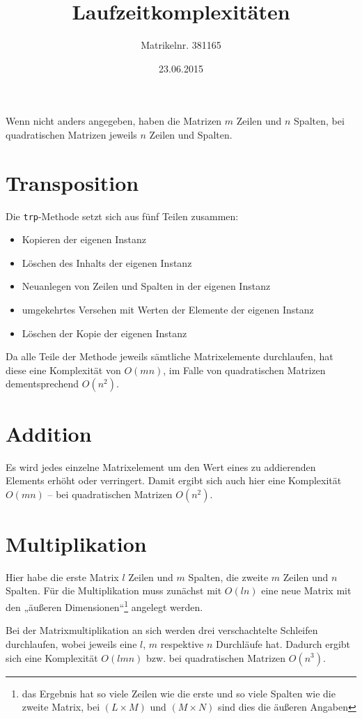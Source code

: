 \documentclass[a4paper,11pt]{scrartcl}
\title{Laufzeitkomplexitäten}
\author{Matrikelnr. 381165}
\date{23.06.2015}
\begin{document}
\maketitle

Wenn nicht anders angegeben, haben die Matrizen $m$ Zeilen und $n$ Spalten, 
bei quadratischen Matrizen jeweils $n$ Zeilen und Spalten.

\section{Transposition}
Die \texttt{trp}-Methode setzt sich aus fünf Teilen zusammen:

\begin{itemize}
    \item Kopieren der eigenen Instanz
    \item Löschen des Inhalts der eigenen Instanz
    \item Neuanlegen von Zeilen und Spalten in der eigenen Instanz
    \item umgekehrtes Versehen mit Werten der Elemente der eigenen Instanz
    \item Löschen der Kopie der eigenen Instanz
\end{itemize}

Da alle Teile der Methode jeweils sämtliche Matrixelemente durchlaufen, hat 
diese eine Komplexität von $O(mn)$, im Falle von quadratischen Matrizen 
dementsprechend $O(n^2)$.

\section{Addition}
Es wird jedes einzelne Matrixelement um den Wert eines zu addierenden 
Elements erhöht oder verringert. Damit ergibt sich auch hier eine Komplexität 
$O(mn)$ – bei quadratischen Matrizen $O(n^2)$.

\section{Multiplikation}
Hier habe die erste Matrix $l$ Zeilen und $m$ Spalten, die zweite $m$ Zeilen 
und $n$ Spalten. Für die Multiplikation muss zunächst mit $O(ln)$ eine neue 
Matrix mit den „äußeren Dimensionen“\footnote{das Ergebnis hat so viele 
Zeilen wie die erste und so viele Spalten wie die zweite Matrix, bei $(L 
\times M)$ und $(M \times N)$ sind dies die äußeren Angaben} angelegt werden. 

Bei der Matrixmultiplikation an sich werden drei verschachtelte Schleifen 
durchlaufen, wobei jeweils eine $l$, $m$ respektive $n$ Durchläufe hat. 
Dadurch ergibt sich eine Komplexität $O(lmn)$ bzw. bei quadratischen Matrizen 
$O(n^3)$.
\end{document}

